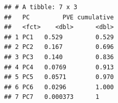 \documentclass[
]{article}
\newenvironment{Shaded}{\begin{snugshade}}{\end{snugshade}}
\newcommand{\AttributeTok}[1]{\textcolor[rgb]{0.13,0.29,0.53}{#1}}
\newcommand{\DecValTok}[1]{\textcolor[rgb]{0.00,0.00,0.81}{#1}}
\newcommand{\FunctionTok}[1]{\textcolor[rgb]{0.13,0.29,0.53}{\textbf{#1}}}
\newcommand{\NormalTok}[1]{#1}
\newcommand{\OtherTok}[1]{\textcolor[rgb]{0.56,0.35,0.01}{#1}}
\newcommand{\SpecialCharTok}[1]{\textcolor[rgb]{0.81,0.36,0.00}{\textbf{#1}}}
\newcommand{\StringTok}[1]{\textcolor[rgb]{0.31,0.60,0.02}{#1}}
\begin{document}
\begin{Shaded}
\end{Shaded}

\begin{verbatim}
## # A tibble: 7 x 3
##   PC         PVE cumulative
##   <fct>    <dbl>      <dbl>
## 1 PC1   0.529         0.529
## 2 PC2   0.167         0.696
## 3 PC3   0.140         0.836
## 4 PC4   0.0769        0.913
## 5 PC5   0.0571        0.970
## 6 PC6   0.0296        1.000
## 7 PC7   0.000373      1
\end{verbatim}
\end{document}
